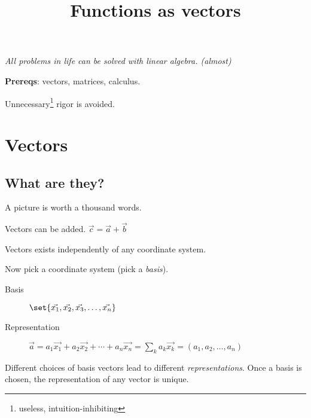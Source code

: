 \documentclass[12pt, oneside, letterpaper, fleqn]{article}
\begin{document}
\title{Functions as vectors}
\author{}
\date{\vspace{-5ex}}
\maketitle

\emph{All problems in life can be solved with linear algebra. (almost)}

\vspace{6ex}\textbf{Prereqs}: vectors, matrices, calculus.

Unnecessary\footnote{useless, intuition-inhibiting} rigor is avoided.

\section{Vectors}
\subsection{What are they?}
A picture is worth a thousand words.

Vectors can be added.
$\vec{c} = \vec{a} + \vec{b}$

Vectors exists independently of any coordinate system.

Now pick a coordinate system (pick a \emph{basis}).
\begin{description}
\item[Basis] $\set{\vec{x_1}, \vec{x_2}, \vec{x_3}, \dotsc,
\vec{x_n}}$

\item[Representation] $\vec{a} = a_1\vec{x_1} + a_2\vec{x_2} +
\dotsb + a_n\vec{x_n} = \sum_k a_k\vec{x_k} = (a_1, a_2, \dotsc,
a_n)$
\end{description}
Different choices of basis vectors lead to different
\emph{representations}. Once a basis is chosen, the representation of
any vector is unique.
\end{document}
